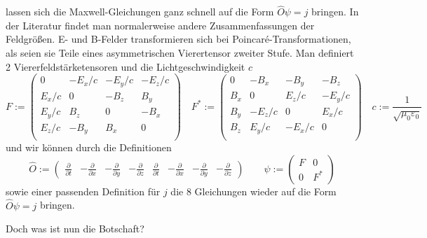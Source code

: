 \documentclass[12pt]{book}
\begin{document}
lassen sich die Maxwell-Gleichungen ganz schnell auf die Form $\hat{O}\psi=j$ bringen. In der Literatur findet man normalerweise andere Zusammenfassungen der Feldgrößen. E- und B-Felder transformieren sich bei Poincaré-Transformationen, als seien sie Teile eines asymmetrischen Vierertensor zweiter Stufe. Man definiert 2 Viererfeldstärketensoren und die Lichtgeschwindigkeit $c$
\begin{equation*} 
F := \left({\begin{matrix}0&-E_{x}/c&-E_{y}/c&-E_{z}/c\\E_{x}/c&0&-B_{z}&B_{y}\\E_{y}/c&B_{z}&0&-B_{x}\\E_{z}/c&-B_{y}&B_{x}&0\\\end{matrix}}\right) 
\quad
F^* := \left({\begin{matrix}0&-B_{x}&-B_{y}&-B_{z}\\B_{x}&0&E_{z}/c&-E_{y}/c\\B_{y}&-E_{z}/c&0&E_{x}/c\\B_{z}&E_{y}/c&-E_{x}/c&0\\\end{matrix}}\right) 
\quad
c := \frac{1}{\sqrt{\mu _0\varepsilon _0}} 
\end{equation*}
und wir können durch die Definitionen
\begin{equation*} 
\hat{O} := \begin{pmatrix} 
\frac{\partial}{\partial t} & -\frac{\partial}{\partial x} & -\frac{\partial}{\partial y} & -\frac{\partial}{\partial z} & 
\frac{\partial}{\partial t} & -\frac{\partial}{\partial x} & -\frac{\partial}{\partial y} & -\frac{\partial}{\partial z} 
\end{pmatrix} \quad\quad 
\psi := \begin{pmatrix} F & 0 \\ 0 & F^* \end{pmatrix} 
\end{equation*}
sowie einer passenden Definition für $j$ die 8 Gleichungen wieder auf die Form $\hat{O}\psi=j$ bringen. 

Doch was ist nun die Botschaft?
\end{document}
